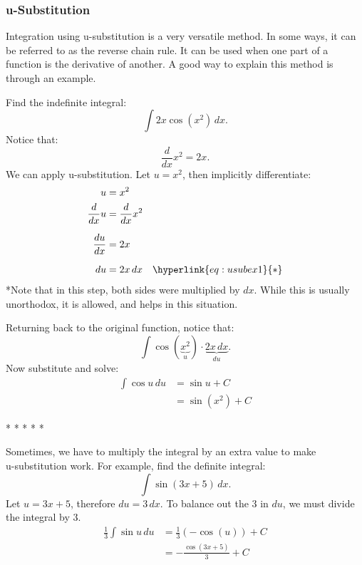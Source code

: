\documentclass[12pt]{article}
\begin{document}
\subsubsection{u-Substitution}
Integration using u-substitution is a very versatile method. In some ways, it can be referred to as the reverse chain rule. It can be used when one part of a function is the derivative of another. A good way to explain this method is through an example.

\noindent Find the indefinite integral:
\[ \int 2x \cos(x^2) \, dx. \]
\newline
Notice that:
\[ \frac{d}{dx} x^2 = 2x. \]
We can apply u-substitution. Let $u = x^2$, then implicitly differentiate:
\begin{align*}
    u              & = x^2                                      \\
    \frac{d}{dx} u & = \frac{d}{dx} x^2                         \\[6pt]
    \frac{du}{dx}  & = 2x                                       \\[6pt]
    du             & = 2x \, dx \quad \hyperlink{eq:usubex1}{*}
\end{align*}
\hypertarget{eq:usubex1}{*}Note that in this step, both sides were multiplied by $dx$. While this is usually unorthodox, it is allowed, and helps in this situation.
\bigskip

\noindent Returning back to the original function, notice that:
\[ \int \cos(\underbrace{x^2}_{u}) \cdot \underbrace{2x \, dx}_{du}. \]
Now substitute and solve:
\begin{align*}
    \int \cos{u} \, du & = \sin{u} + C   \\
                       & = \sin(x^2) + C
\end{align*}
\begin{center}
    * * * * *
\end{center}

Sometimes, we have to multiply the integral by an extra value to make \\u-substitution work. For example, find the definite integral: %
\[ \int \sin(3x+5) \, dx. \]
Let $u = 3x+5$, therefore $du = 3 \, dx$. To balance out the $3$ in $du$, we must divide the integral by $3$.
\begin{align*}
    \frac{1}{3} \int \sin{u} \, du & = \frac{1}{3} \left( -\cos(u) \right) + C \\[6pt]
                                   & = -\frac{\cos(3x+5)}{3} + C
\end{align*}
\end{document}
